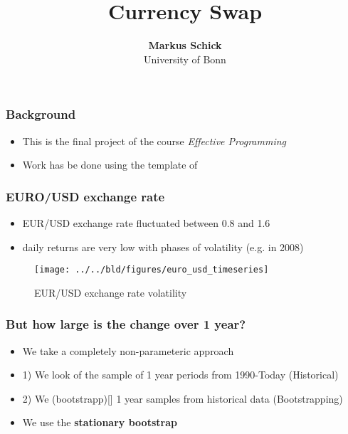 \documentclass[11pt]{beamer}
\begin{document}
\title{Currency Swap}

\author[Markus Schick]
{
{\bf Markus Schick}\\
{\small University of Bonn}\\[1ex]
}


\begin{frame}
    \titlepage
    \note{~}
\end{frame}

\begin{frame}[t]
    \frametitle{Background}
    \begin{itemize}
        \item This is the final project of the course \textit{Effective Programming}
        \item Work has be done using the template of \citet{GaudeckerEconProjectTemplates}
    \end{itemize}
    \note{~}
\end{frame}



\begin{frame}[t]
    \frametitle{EURO/USD exchange rate}
    \begin{itemize}
        \item EUR/USD exchange rate fluctuated between 0.8 and 1.6
        \item daily returns are very low with phases of volatility (e.g. in 2008)
    \end{itemize}
    \begin{figure}
        \caption{EUR/USD exchange rate volatility}
        \texttt{[image: ../../bld/figures/euro\_usd\_timeseries]}
    \end{figure}
    \note{~}
\end{frame}

\begin{frame}[t]
    \frametitle{But how large is the change over 1 year?}
    \begin{itemize}
        \item We take a completely non-parameteric approach
        \item 1) We look of the sample of 1 year periods from 1990-Today (Historical)
        \item 2) We (bootstrapp)[] 1 year samples from historical data (Bootstrapping)
        \item We use the \bf{stationary bootstrap}
    \end{itemize}
    \note{~}
\end{frame}
\end{document}
